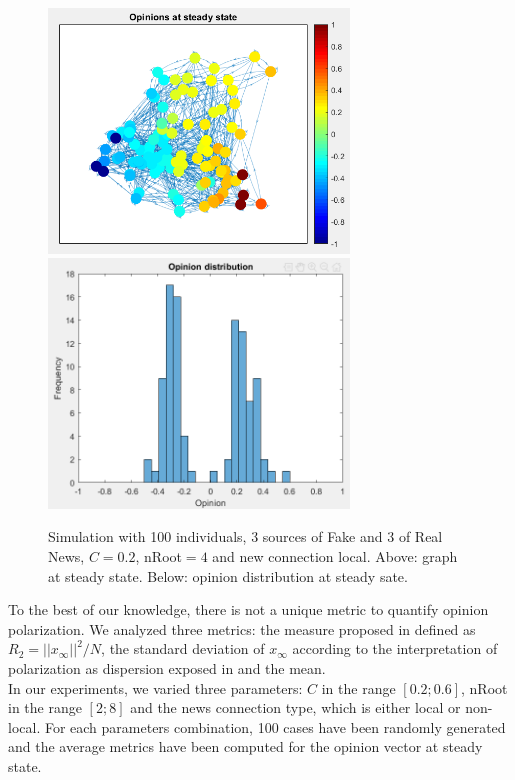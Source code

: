 \begin{figure}[!t]
\centering
\includegraphics[width=8cm]{Figures/Exp20_graphb.png}
\includegraphics[width=8cm]{Figures/Exp20_hystb.png}
\caption{Simulation with 100 individuals, 3 sources of Fake and 3 of Real News, $C=0.2$, nRoot$=4$ and new connection local. Above: graph at steady state. Below: opinion distribution at steady sate.}
\label{pics:exp20}
\end{figure}

To the best of our knowledge, there is not a unique metric to quantify opinion polarization. We analyzed three metrics: the measure proposed in \cite{Matakos2017} defined as $R_2 = ||x_{\infty}||^2/ N$, the standard deviation of $x_{\infty}$ according to the interpretation of polarization as dispersion exposed in \cite{Bramsona2016} and the mean.\\

In our experiments, we varied three parameters: $C$ in the range $[0.2; 0.6]$, nRoot in the range $[2; 8]$ and the news connection type, which is either local or non-local. For each parameters combination, 100 cases have been randomly generated and the average metrics have been computed for the opinion vector at steady state.\\

